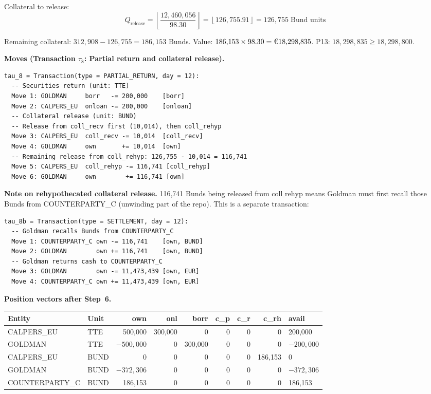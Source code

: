 \documentclass[11pt,a4paper]{article}
\newcommand{\EUR}[1]{\texteuro#1}
\begin{document}
Collateral to release:
\[
Q_{\mathrm{release}} = \left\lfloor \frac{12{,}460{,}056}{98.30} \right\rfloor = \left\lfloor 126{,}755.91 \right\rfloor = 126{,}755 \;\text{Bund units}
\]

\noindent Remaining collateral: $312{,}908 - 126{,}755 = 186{,}153$ Bunds. Value: $186{,}153 \times 98.30 = \text{\EUR{18,298,835}}$. P13: $18{,}298{,}835 \geq 18{,}298{,}800$. \checkmark

\medskip
\noindent\textbf{Moves (Transaction $\tau_8$: Partial return and collateral release).}

\begin{lstlisting}
tau_8 = Transaction(type = PARTIAL_RETURN, day = 12):
  -- Securities return (unit: TTE)
  Move 1: GOLDMAN     borr   -= 200,000    [borr]
  Move 2: CALPERS_EU  onloan -= 200,000    [onloan]
  -- Collateral release (unit: BUND)
  -- Release from coll_recv first (10,014), then coll_rehyp
  Move 3: CALPERS_EU  coll_recv -= 10,014  [coll_recv]
  Move 4: GOLDMAN     own       += 10,014  [own]
  -- Remaining release from coll_rehyp: 126,755 - 10,014 = 116,741
  Move 5: CALPERS_EU  coll_rehyp -= 116,741 [coll_rehyp]
  Move 6: GOLDMAN     own        += 116,741 [own]
\end{lstlisting}

\noindent\textbf{Note on rehypothecated collateral release.} 116{,}741 Bunds being released from $\mathrm{coll\_rehyp}$ means Goldman must first recall those Bunds from COUNTERPARTY\_C (unwinding part of the repo). This is a separate transaction:

\begin{lstlisting}
tau_8b = Transaction(type = SETTLEMENT, day = 12):
  -- Goldman recalls Bunds from COUNTERPARTY_C
  Move 1: COUNTERPARTY_C own -= 116,741    [own, BUND]
  Move 2: GOLDMAN        own += 116,741    [own, BUND]
  -- Goldman returns cash to COUNTERPARTY_C
  Move 3: GOLDMAN        own -= 11,473,439 [own, EUR]
  Move 4: COUNTERPARTY_C own += 11,473,439 [own, EUR]
\end{lstlisting}

\medskip
\noindent\textbf{Position vectors after Step~6.}

\begin{center}\small
\begin{tabular}{l l r r r r r r l}
\toprule
\textbf{Entity} & \textbf{Unit} & own & onl & borr & c\_p & c\_r & c\_rh & avail \\
\midrule
CALPERS\_EU & TTE & 500{,}000 & 300{,}000 & 0 & 0 & 0 & 0 & 200{,}000 \\
GOLDMAN & TTE & $-500{,}000$ & 0 & 300{,}000 & 0 & 0 & 0 & $-200{,}000$ \\
\midrule
CALPERS\_EU & BUND & 0 & 0 & 0 & 0 & 0 & 186{,}153 & 0 \\
GOLDMAN & BUND & $-372{,}306$ & 0 & 0 & 0 & 0 & 0 & $-372{,}306$ \\
COUNTERPARTY\_C & BUND & 186{,}153 & 0 & 0 & 0 & 0 & 0 & 186{,}153 \\
\bottomrule
\end{tabular}
\end{center}
\end{document}
